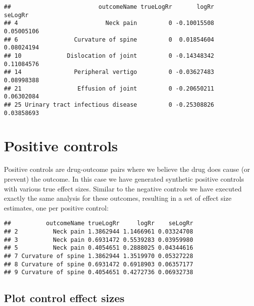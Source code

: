 \documentclass[]{article}
\newenvironment{Shaded}{\begin{snugshade}}{\end{snugshade}}
\newcommand{\DecValTok}[1]{\textcolor[rgb]{0.00,0.00,0.81}{#1}}
\newcommand{\KeywordTok}[1]{\textcolor[rgb]{0.13,0.29,0.53}{\textbf{#1}}}
\newcommand{\NormalTok}[1]{#1}
\newcommand{\OperatorTok}[1]{\textcolor[rgb]{0.81,0.36,0.00}{\textbf{#1}}}
\newcommand{\StringTok}[1]{\textcolor[rgb]{0.31,0.60,0.02}{#1}}
\begin{document}
\begin{verbatim}
##                         outcomeName trueLogRr       logRr    seLogRr
## 4                         Neck pain         0 -0.10015508 0.05005106
## 6                Curvature of spine         0  0.01854604 0.08024194
## 10             Dislocation of joint         0 -0.14348342 0.11084576
## 14               Peripheral vertigo         0 -0.03627483 0.08998388
## 21                Effusion of joint         0 -0.20650211 0.06302084
## 25 Urinary tract infectious disease         0 -0.25308826 0.03858693
\end{verbatim}

\hypertarget{positive-controls}{%
\section{Positive controls}\label{positive-controls}}

Positive controls are drug-outcome pairs where we believe the drug does
cause (or prevent) the outcome. In this case we have generated synthetic
positive controls with various true effect sizes. Similar to the
negative controls we have executed exactly the same analysis for these
outcomes, resulting in a set of effect size estimates, one per positive
control:

\begin{Shaded}
\end{Shaded}

\begin{verbatim}
##          outcomeName trueLogRr     logRr    seLogRr
## 2          Neck pain 1.3862944 1.1466961 0.03324708
## 3          Neck pain 0.6931472 0.5539283 0.03959980
## 5          Neck pain 0.4054651 0.2888025 0.04344616
## 7 Curvature of spine 1.3862944 1.3519970 0.05327228
## 8 Curvature of spine 0.6931472 0.6918903 0.06357177
## 9 Curvature of spine 0.4054651 0.4272736 0.06932738
\end{verbatim}

\hypertarget{plot-control-effect-sizes}{%
\subsection{Plot control effect sizes}\label{plot-control-effect-sizes}}
\end{document}
